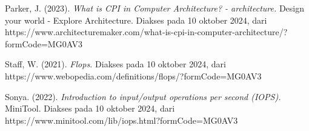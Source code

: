 \documentclass[12pt]{article}
\begin{document}
\begin{thebibliography}{3}
    Parker, J. (2023). \textit{What is CPI in Computer Architecture? - architecture.} Design your world - Explore Architecture. Diakses pada 10 oktober 2024, dari https://www.architecturemaker.com/what-is-cpi-in-computer-architecture/?formCode=MG0AV3 

    Staff, W. (2021). \textit{Flops.} Diakses pada 10 oktober 2024, dari https://www.webopedia.com/definitions/flops/?formCode=MG0AV3 

    Sonya. (2022). \textit{Introduction to input/output operations per second (IOPS).} MiniTool. Diakses pada 10 oktober 2024, dari https://www.minitool.com/lib/iops.html?formCode=MG0AV3 

\end{thebibliography}
\end{document}
